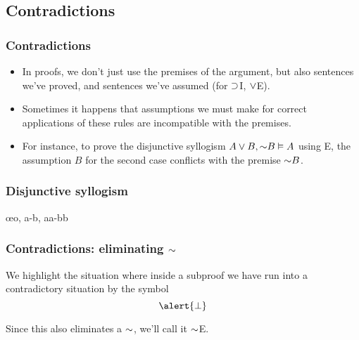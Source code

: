 \subsection{Contradictions}

\begin{frame}
  \frametitle{Contradictions}

  \begin{itemize}[<+->]
  \item In proofs, we don't just use the premises of the argument, but also
  sentences we've proved, and sentences we've assumed (for $\supset$I,
  $\vee$E).

  \item Sometimes it happens that assumptions we must make for correct
  applications of these rules are incompatible with the premises.

  \item For instance, to prove the disjunctive syllogism $A \eor B,
  \enot B \entails A$ using \eor E, the assumption $B$ for the second
  case conflicts with the premise $\enot B$.
  \end{itemize}
\end{frame}

\begin{frame}
  \frametitle{Disjunctive syllogism}
  \begin{fitchproof}
    \open
     
    \close
    \open
    \ellipsesline
    \close
     \oe{o, a-b, aa-bb}
  \end{fitchproof}
\end{frame}

\begin{frame}
  \frametitle{Contradictions: eliminating $\enot$}

  We highlight the situation where inside a subproof we have run into
  a contradictory situation by the symbol \[\alert{\bot}\]

  \begin{fitchproof}
     
  \end{fitchproof}

  Since this also eliminates a $\enot$, we'll call it $\enot$E.
\end{frame}

